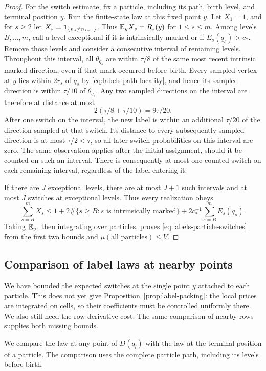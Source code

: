 \begin{proof}
For the switch estimate, fix a particle, including its path, birth level,
and terminal position $y$. Run the finite-state law at this fixed point
$y$. Let $X_1=1$, and for $s\ge2$ let
$X_s=\mathbf 1_{\{n_s\ne n_{s-1}\}}$. Thus $\mathbb E_y X_s=R_s(y)$ for $1\le s\le m$.
Among levels $B,\ldots,m$, call a level exceptional if it is intrinsically
marked or if $E_s(q_s)>c_*$. Remove those levels and consider a consecutive
interval of remaining levels. Throughout this interval, all
$\theta_{q_s}$ are within $\tau/8$ of the same most recent intrinsic
marked direction, even if that mark occurred before birth. Every sampled
vertex at $y$ lies within $2r_s$ of $q_s$ by
\eqref{eq:labels-path-locality}, and hence its sampled direction is within
$\tau/10$ of $\theta_{q_s}$. Any two sampled directions on the interval
are therefore at distance at most
\[
 2(\tau/8+\tau/10)=9\tau/20.
\]
After one switch on the interval, the new label is within an additional
$\tau/20$ of the direction sampled at that switch. Its distance to every
subsequently sampled direction is at most $\tau/2<\tau$, so all later
switch probabilities on this interval are zero. The same observation
applies after the initial assignment, should it be counted on such an
interval. There is consequently at most one counted switch on each
remaining interval, regardless of the label entering it.

If there are $J$ exceptional levels, there are at most $J+1$ such
intervals and at most $J$ switches at exceptional levels. Thus every
realization obeys
\[
 \sum_{s=B}^m X_s
 \le1+2\#\{s\ge B:s\text{ is intrinsically marked}\}
       +2c_*^{-1}\sum_{s=B}^m E_s(q_s).
\]
Taking $\mathbb E_y$, then integrating over particles, proves
\eqref{eq:labels-particle-switches} from the first two bounds and
$\mu(\text{all particles})\le V$.
\end{proof}

\subsection{Comparison of label laws at nearby points}

We have bounded the expected switches at the single point $y$ attached
to each particle. This does not yet give Proposition~\ref{prop:label-packing}:
the local prices are integrated on cells, so their coefficients must
be controlled uniformly there. We also still need the row-derivative
cost. The same comparison of nearby rows supplies both missing bounds.

We compare the law at any point of $D(q_l)$ with the law at the
terminal position of a particle. The comparison uses the complete particle
path, including its levels before birth.

